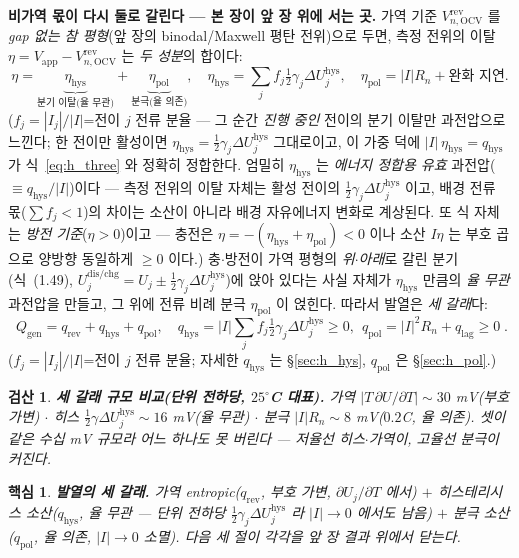 \documentclass[11pt,a4paper]{article}
\newtheorem*{keybox}{핵심}
\newtheorem*{verifybox}{검산}
\newcommand{\app}{\mathrm{app}}
\newcommand{\OCV}{\mathrm{OCV}}
\newcommand{\dis}{\mathrm{dis}}
\newcommand{\chg}{\mathrm{chg}}
\newcommand{\hys}{\mathrm{hys}}
\newcommand{\pol}{\mathrm{pol}}
\newcommand{\rev}{\mathrm{rev}}
\newcommand{\gen}{\mathrm{gen}}
\newcommand{\lag}{\mathrm{lag}}
\begin{document}
\textbf{비가역 몫이 다시 둘로 갈린다 — 본 장이 앞 장 위에 서는 곳.} 가역 기준 $V_{n,\OCV}^\rev$ 를 \emph{gap
없는 참 평형}(앞 장의 binodal/Maxwell 평탄 전위)으로 두면, 측정 전위의 이탈 $\eta=V_\app-V_{n,\OCV}^\rev$ 는
\emph{두 성분}의 합이다:
\begin{equation}
\eta=\underbrace{\eta_\hys}_{\text{분기 이탈(율 무관)}}+\underbrace{\eta_\pol}_{\text{분극(율 의존)}},\quad
\eta_\hys=\sum_jf_j\tfrac12\gamma_j\Delta U_j^\hys,\quad \eta_\pol=|I|R_n+\text{완화 지연}.
\label{eq:h_eta_split}
\end{equation}
($f_j=|I_j|/|I|$=전이 $j$ 전류 분율 — 그 순간 \emph{진행 중인} 전이의 분기 이탈만 과전압으로 느낀다; 한 전이만
활성이면 $\eta_\hys=\tfrac12\gamma_j\Delta U_j^\hys$ 그대로이고, 이 가중 덕에 $|I|\,\eta_\hys=q_\hys$ 가 식~\eqref{eq:h_three}
와 정확히 정합한다. 엄밀히 $\eta_\hys$ 는 \emph{에너지 정합용 유효} 과전압($\equiv q_\hys/|I|$)이다 — 측정 전위의
이탈 자체는 활성 전이의 $\tfrac12\gamma_j\Delta U_j^\hys$ 이고, 배경 전류 몫($\sum f_j<1$)의 차이는 소산이 아니라
배경 자유에너지 변화로 계상된다. 또 식 자체는 \emph{방전 기준}($\eta>0$)이고 — 충전은 $\eta=-(\eta_\hys+\eta_\pol)<0$
이나 소산 $I\eta$ 는 부호 곱으로 양방향 동일하게 $\ge0$ 이다.) 충$\cdot$방전이 가역 평형의 \emph{위$\cdot$아래}로 갈린 분기(식~(1.49), $U_j^{\dis/\chg}=U_j\pm\tfrac12\gamma_j
\Delta U_j^\hys$)에 앉아 있다는 사실 자체가 $\eta_\hys$ 만큼의 \emph{율 무관} 과전압을 만들고, 그 위에 전류 비례
분극 $\eta_\pol$ 이 얹힌다. 따라서 발열은 \emph{세 갈래}다:
\begin{equation}
\boxed{\;Q_\gen=q_\rev+q_\hys+q_\pol,\quad q_\hys=|I|\textstyle\sum_jf_j\tfrac12\gamma_j\Delta U_j^\hys\ge0,\ \ q_\pol=|I|^2R_n+q_\lag\ge0\;.}
\label{eq:h_three}
\end{equation}
($f_j=|I_j|/|I|$=전이 $j$ 전류 분율; 자세한 $q_\hys$ 는 \S\ref{sec:h_hys}, $q_\pol$ 은 \S\ref{sec:h_pol}.)
\begin{verifybox}
\textbf{세 갈래 규모 비교(단위 전하당, $25^\circ$C 대표).} 가역 $|T\,\partial U/\partial T|\sim30$ mV(부호 가변)
$\cdot$ 히스 $\tfrac12\gamma\Delta U_j^\hys\sim16$ mV(율 무관) $\cdot$ 분극 $|I|R_n\sim8$ mV($0.2$C, 율 의존). 셋이
\emph{같은 수십 mV 규모}라 어느 하나도 못 버린다 — 저율선 히스$\cdot$가역이, 고율선 분극이 커진다.
\end{verifybox}
\begin{keybox}
\textbf{발열의 세 갈래.} \emph{가역 entropic}($q_\rev$, 부호 가변, $\partial U_j/\partial T$ 에서) $+$
\emph{히스테리시스 소산}($q_\hys$, \emph{율 무관} — 단위 전하당 $\tfrac12\gamma_j\Delta U_j^\hys$ 라 $|I|\to0$ 에서도
남음) $+$ \emph{분극 소산}($q_\pol$, 율 의존, $|I|\to0$ 소멸). 다음 세 절이 각각을 앞 장 결과 위에서 닫는다.
\end{keybox}
\end{document}
